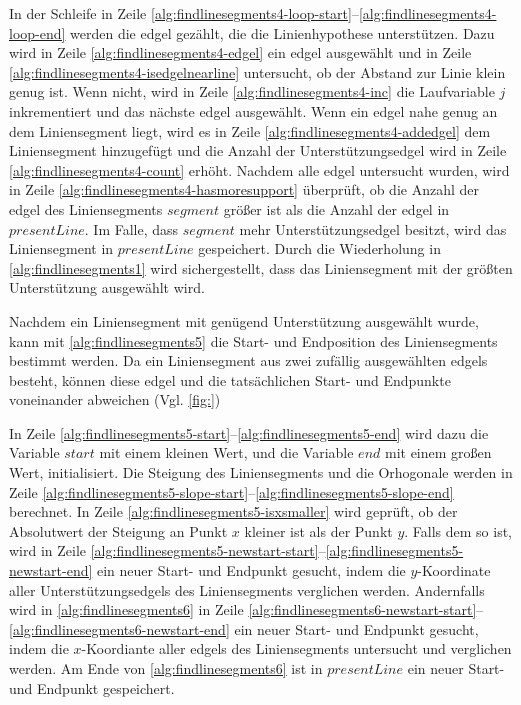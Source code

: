 In der Schleife in Zeile \ref{alg:findlinesegments4-loop-start}--\ref{alg:findlinesegments4-loop-end} werden die
 \gls{edgel} gezählt, die die Linienhypothese unterstützen. Dazu wird in Zeile \ref{alg:findlinesegments4-edgel} ein
 \gls{edgel} ausgewählt und in Zeile \ref{alg:findlinesegments4-isedgelnearline} untersucht, ob der Abstand zur Linie
 klein genug ist. Wenn nicht, wird in Zeile \ref{alg:findlinesegments4-inc} die Laufvariable $j$ inkrementiert und das
 nächste \gls{edgel} ausgewählt. Wenn ein \gls{edgel} nahe genug an dem Liniensegment liegt, wird es in Zeile
 \ref{alg:findlinesegments4-addedgel} dem Liniensegment hinzugefügt und die Anzahl der Unterstützungsedgel wird in
 Zeile \ref{alg:findlinesegments4-count} erhöht. Nachdem alle \gls{edgel} untersucht wurden, wird in Zeile
 \ref{alg:findlinesegments4-hasmoresupport} überprüft, ob die Anzahl der \gls{edgel} des Liniensegments
 $\mathit{segment}$ größer ist als die Anzahl der \gls{edgel} in $\mathit{presentLine}$. Im Falle, dass
 $\mathit{segment}$ mehr Unterstützungsedgel besitzt, wird das Liniensegment in $\mathit{presentLine}$ gespeichert.
 Durch die Wiederholung in \autoref{alg:findlinesegments1} wird sichergestellt, dass das Liniensegment mit der
 größten Unterstützung ausgewählt wird.

Nachdem ein Liniensegment mit genügend Unterstützung ausgewählt wurde, kann mit \autoref{alg:findlinesegments5} die
 Start- und Endposition des Liniensegments bestimmt werden. Da ein Liniensegment aus zwei zufällig ausgewählten
 \glspl{edgel} besteht, können diese \gls{edgel} und die tatsächlichen Start- und Endpunkte voneinander abweichen
 (Vgl. \autoref{fig:})



In Zeile \ref{alg:findlinesegments5-start}--\ref{alg:findlinesegments5-end} wird dazu die Variable $\mathit{start}$ mit
 einem kleinen Wert, und die Variable $\mathit{end}$ mit einem großen Wert, initialisiert. Die Steigung des
 Liniensegments und die Orhogonale werden in Zeile
 \ref{alg:findlinesegments5-slope-start}--\ref{alg:findlinesegments5-slope-end} berechnet. In Zeile
 \ref{alg:findlinesegments5-isxsmaller} wird geprüft, ob der Absolutwert der Steigung an Punkt $x$ kleiner ist als der
 Punkt $y$. Falls dem so ist, wird in Zeile
 \ref{alg:findlinesegments5-newstart-start}--\ref{alg:findlinesegments5-newstart-end} ein neuer Start- und Endpunkt
 gesucht, indem die $y$-Koordinate aller Unterstützungsedgels des Liniensegments verglichen werden. Andernfalls wird in
 \autoref{alg:findlinesegments6} in Zeile
 \ref{alg:findlinesegments6-newstart-start}--\ref{alg:findlinesegments6-newstart-end} ein neuer Start- und Endpunkt
 gesucht, indem die $x$-Koordiante aller \glspl{edgel} des Liniensegments untersucht und verglichen werden. Am Ende von
 \autoref{alg:findlinesegments6} ist in $\mathit{presentLine}$ ein neuer Start- und Endpunkt gespeichert.


